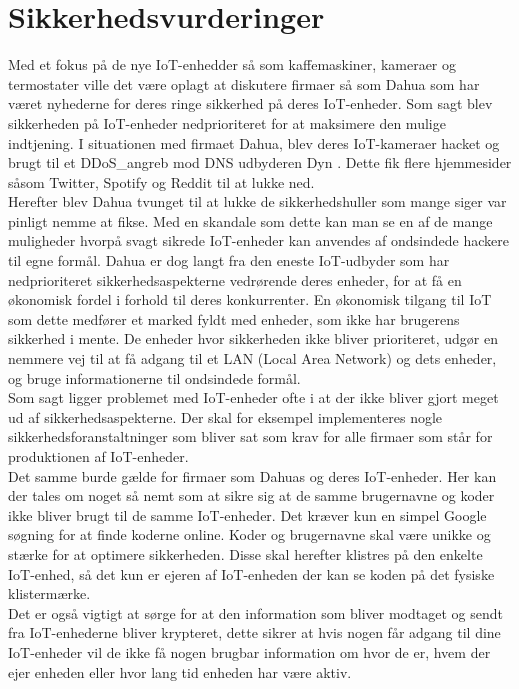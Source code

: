 \section{Sikkerhedsvurderinger}

    Med et fokus på de nye IoT-enhedder så som kaffemaskiner, kameraer og termostater ville det være oplagt at diskutere firmaer så som Dahua som har været nyhederne for deres ringe sikkerhed på deres IoT-enheder. Som sagt blev sikkerheden på IoT-enheder nedprioriteret for at maksimere den mulige indtjening. I situationen med firmaet Dahua, blev deres IoT-kameraer hacket og brugt til et \Gls{DDoS_angreb} mod DNS udbyderen Dyn \autocite{MotherboardVice}. Dette fik flere hjemmesider såsom Twitter, Spotify og Reddit til at lukke ned. \\ 
    Herefter blev Dahua tvunget til at lukke de sikkerhedshuller som mange siger var pinligt nemme at fikse. Med en skandale som dette kan man se en af de mange muligheder hvorpå svagt sikrede IoT-enheder kan anvendes af ondsindede hackere til egne formål. Dahua er dog langt fra den eneste IoT-udbyder som har nedprioriteret sikkerhedsaspekterne vedrørende deres enheder, for at få en økonomisk fordel i forhold til deres konkurrenter. En økonomisk tilgang til IoT som dette medfører et marked fyldt med enheder, som ikke har brugerens sikkerhed i mente. De enheder hvor sikkerheden ikke bliver prioriteret, udgør en nemmere vej til at få adgang til et LAN (Local Area Network) og dets enheder, og bruge informationerne til ondsindede formål.  \autocite{Androidauthority}\\
    Som sagt ligger problemet med IoT-enheder ofte i at der ikke bliver gjort meget ud af sikkerhedsaspekterne. Der skal for eksempel implementeres nogle sikkerhedsforanstaltninger som bliver sat som krav for alle firmaer som står for produktionen af IoT-enheder.\\ 
    Det samme burde gælde for firmaer som Dahuas og deres IoT-enheder. 
    Her kan der tales om noget så nemt som at sikre sig at de samme brugernavne og koder ikke bliver brugt til de samme IoT-enheder. Det kræver kun en simpel Google søgning for at finde koderne online. Koder og brugernavne skal være unikke og stærke for at optimere sikkerheden. Disse skal herefter klistres på den enkelte IoT-enhed, så det kun er ejeren af IoT-enheden der kan se koden på det fysiske klistermærke. \\ 
    Det er også vigtigt at sørge for at den information som bliver modtaget og sendt fra IoT-enhederne bliver krypteret, dette sikrer at hvis nogen får adgang til dine IoT-enheder vil de ikke få nogen brugbar information om hvor de er, hvem der ejer enheden eller hvor lang tid enheden har være aktiv.\\
